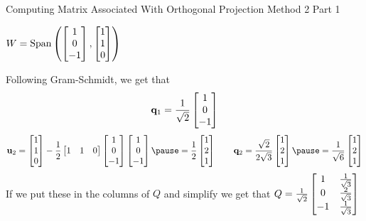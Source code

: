 \documentclass[xcoler=dvipsnames, aspectratio=169]{beamer}
\begin{document}
    \begin{frame}{Computing Matrix Associated With Orthogonal Projection Method 2 Part 1}
        \footnotesize
        \begin{center}
            $W=\text{Span}\left(\begin{bmatrix}1\\0\\-1\end{bmatrix}, \begin{bmatrix}1\\1\\0\end{bmatrix}\right)$
        \end{center}
        Following Gram-Schmidt, we get that
        \[
            \mathbf{q}_1 = \frac{1}{\sqrt{2}}\begin{bmatrix}1\\0\\-1\end{bmatrix}
        \]\pause
        \[
            \vec{u}_2 = \bMat{1\\1\\0} - \frac{1}{2}\bMat{1&1&0}\bMat{1\\0\\-1}\bMat{1\\0\\-1}\pause = \frac{1}{2}\bMat{1\\2\\1}
            \qquad\vec{q}_2 = \frac{\sqrt{2}}{2\sqrt{3}}\bMat{1\\2\\1}\pause = \frac{1}{\sqrt{6}}\bMat{1\\2\\1}
        \]\pause
        If we put these in the columns of $Q$ and simplify we get that $Q = \frac{1}{\sqrt{2}}\begin{bmatrix}
            1 & \frac{1}{\sqrt{3}}\\
            0 & \frac{2}{\sqrt{3}}\\
            -1& \frac{1}{\sqrt{3}}
        \end{bmatrix}$
    \end{frame}
\end{document}
